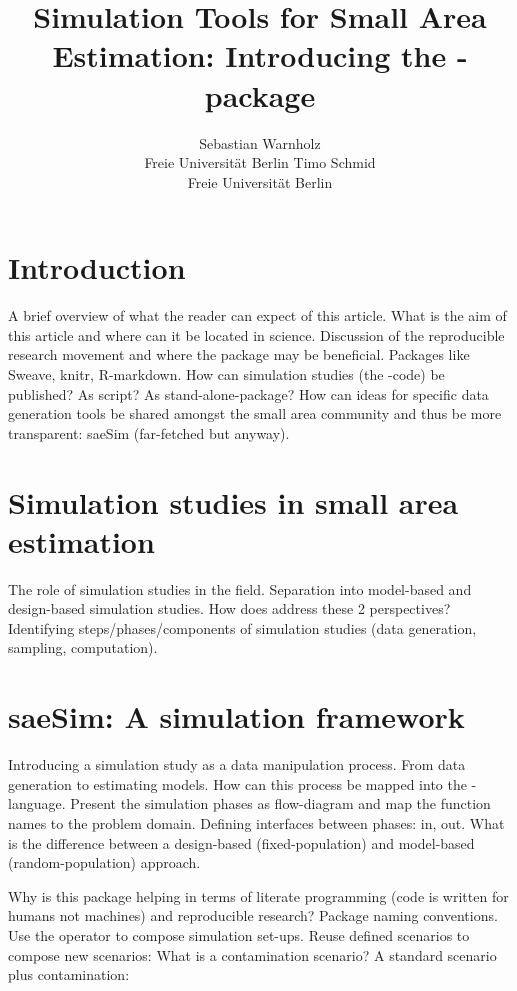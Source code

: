 \documentclass[article]{ajs}
\author{Sebastian Warnholz\\ Freie Universit\"at Berlin \And 
        Timo Schmid \\ Freie Universit\"at Berlin}
\title{Simulation Tools for Small Area Estimation: Introducing the \proglang{R}-package \proglang{saeSim}}
\begin{document}


\section{Introduction}
A brief overview of what the reader can expect of this article. What is the aim of this article and where can it be located in science. Discussion of the reproducible research movement and where the package may be beneficial. Packages like Sweave, knitr, R-markdown. How can simulation studies (the -code) be published? As script? As stand-alone-package? How can ideas for specific data generation tools be shared amongst the small area community and thus be more transparent: saeSim (far-fetched but anyway).


\section{Simulation studies in small area estimation}
The role of simulation studies in the field. Separation into model-based and design-based simulation studies. How does  address these 2 perspectives? Identifying steps/phases/components of simulation studies (data generation, sampling, computation).


\section{saeSim: A simulation framework}
Introducing a simulation study as a data manipulation process. From data generation to estimating models. How can this process be mapped into the -language. Present the simulation phases as flow-diagram and map the function names to the problem domain. Defining interfaces between phases:  in,  out. What is the difference between a design-based (fixed-population) and model-based (random-population) approach. 

Why is this package helping in terms of literate programming (code is written for humans not machines) and reproducible research? Package naming conventions. Use the \proglang{\%>\%} operator to compose simulation set-ups. Reuse defined scenarios to compose new scenarios: What is a contamination scenario? A standard scenario plus contamination:
\end{document}
